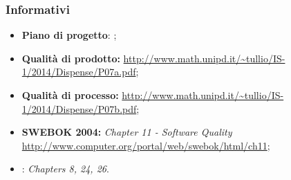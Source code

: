 		\subsubsection{Informativi}
			\begin{itemize}
  				\item \textbf{Piano di progetto}: \docNameVersionPdP;
  				\item \textbf{Qualità di prodotto:} \url{http://www.math.unipd.it/~tullio/IS-1/2014/Dispense/P07a.pdf}; 
  				\item \textbf{Qualità di processo:} \url{http://www.math.unipd.it/~tullio/IS-1/2014/Dispense/P07b.pdf};
  				\item \textbf{SWEBOK 2004:} \textit{Chapter 11 - Software Quality} \url{http://www.computer.org/portal/web/swebok/html/ch11};
  				\item \textbf{\sommerville}: \textit{Chapters 8, 24, 26}.
			\end{itemize}
			\pagebreak